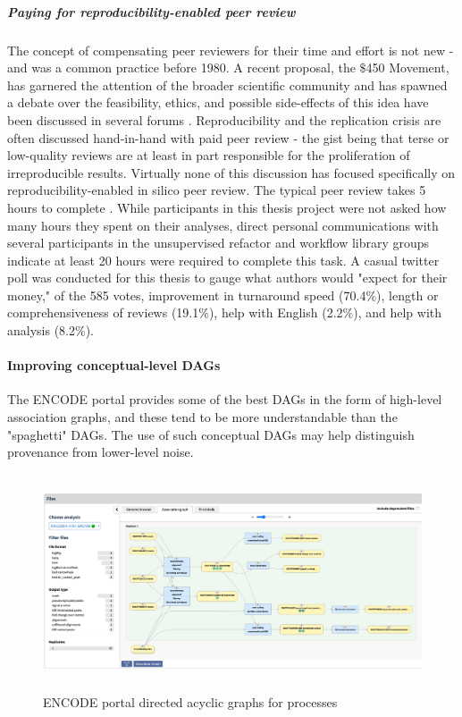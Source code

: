 \documentclass{drexelthesis}
\begin{document}
\subparagraph{Paying for reproducibility-enabled peer review}

The concept of compensating peer reviewers for their time and effort is not new - and was a common practice before 1980. A recent proposal, the $\$$450 Movement, has garnered the attention of the broader scientific community \cite{noauthor_2021-ok} and has spawned a debate over the feasibility, ethics, and possible side-effects of this idea have been discussed in several forums \cite{Vines2021-bh}. Reproducibility and the replication crisis are often discussed hand-in-hand with paid peer review - the gist being that terse or low-quality reviews are at least in part responsible for the proliferation of irreproducible results. Virtually none of this discussion has focused specifically on reproducibility-enabled in silico peer review. The typical peer review takes 5 hours to complete \cite{Mark_Ware2015-bx}. While participants in this thesis project were not asked how many hours they spent on their analyses, direct personal communications with several participants in the unsupervised refactor and workflow library groups indicate at least 20 hours were required to complete this task. A casual twitter poll was conducted for this thesis to gauge what authors would "expect for their money," of the 585 votes, improvement in turnaround speed (70.4$\%$), length or comprehensiveness of reviews (19.1$\%$), help with English (2.2$\%$), and help with analysis (8.2$\%$).

\paragraph{Improving conceptual-level DAGs}

The ENCODE portal \cite{Hong2016-en} provides some of the best DAGs in the form of high-level association graphs, and these tend to be more understandable than the "spaghetti" DAGs. The use of such conceptual DAGs may help distinguish provenance from lower-level noise.

\begin{figure}[h!]
	\centering
	\includegraphics[width=13.76cm,height=6.38cm]{./images/encode.png}
	\caption{ENCODE portal directed acyclic graphs for processes}
	\label{encode}
\end{figure}
\end{document}
